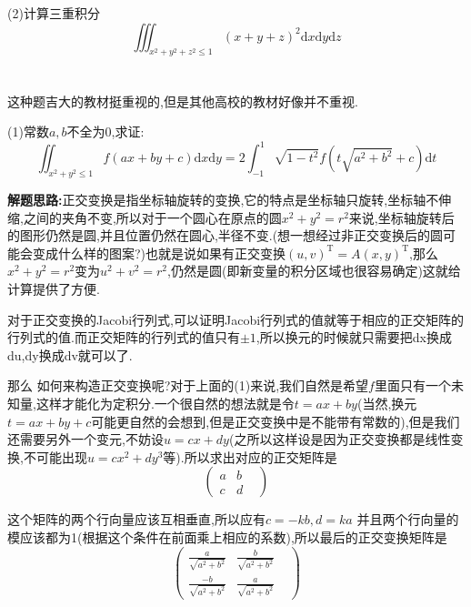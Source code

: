 \documentclass{ctexart}
\begin{document}
(2)计算三重积分$$\iiint_{x^{2}+y^{2}+z^{2}\leq1}(x+y+z)^{2}\mathrm{d}x\mathrm{d}y\mathrm{d}z$$

\section{}

这种题吉大的教材挺重视的,但是其他高校的教材好像并不重视.


(1)常数$a,b$不全为0,求证:$$\iint_{x^{2}+y^{2}\leq1}f(ax+by+c)\mathrm{d}x\mathrm{d}y=2\int^{1}_{-1}\sqrt{1-t^{2}}f(t\sqrt{a^{2}+b^{2}}+c)\mathrm{d}t$$

\textbf{解题思路:}正交变换是指坐标轴旋转的变换,它的特点是坐标轴只旋转,坐标轴不伸缩,之间的夹角不变,所以对于一个圆心在原点的圆$x^{2}+y^{2}=r^{2}$来说,坐标轴旋转后的图形仍然是圆,并且位置仍然在圆心,半径不变.(想一想经过非正交变换后的圆可能会变成什么样的图案?)也就是说如果有正交变换$(u,v)^{\mathrm{T}}=A(x,y)^{\mathrm{T}}$,那么$x^{2}+y^{2}=r^{2}$变为$u^{2}+v^{2}=r^{2}$,仍然是圆(即新变量的积分区域也很容易确定)这就给计算提供了方便.

对于正交变换的Jacobi行列式,可以证明Jacobi行列式的值就等于相应的正交矩阵的行列式的值.而正交矩阵的行列式的值只有$\pm 1$,所以换元的时候就只需要把dx换成du,dy换成dv就可以了.

那么 如何来构造正交变换呢?对于上面的(1)来说,我们自然是希望$f$里面只有一个未知量,这样才能化为定积分.一个很自然的想法就是令$t=ax+by$(当然,换元$t=ax+by+c$可能更自然的会想到,但是正交变换中是不能带有常数的),但是我们还需要另外一个变元,不妨设$u=cx+dy$(之所以这样设是因为正交变换都是线性变换,不可能出现$u=cx^{2}+dy^{3}$等).所以求出对应的正交矩阵是
\begin{equation}\nonumber
{
\left( \begin{array}{ccc}
a& b &\\
c& d &
\end{array}
\right )}
\end{equation}

这个矩阵的两个行向量应该互相垂直,所以应有$c=-kb,d=ka$
并且两个行向量的模应该都为1(根据这个条件在前面乘上相应的系数),所以最后的正交变换矩阵是
\begin{equation}\nonumber
{
\left( \begin{array}{ccc}
\frac{a}{\sqrt{a^{2}+b^{2}}}& \frac{b}{\sqrt{a^{2}+b^{2}}} &\\
\frac{-b}{\sqrt{a^{2}+b^{2}}}& \frac{a}{\sqrt{a^{2}+b^{2}}} &
\end{array}
\right )}
\end{equation}
\end{document}
